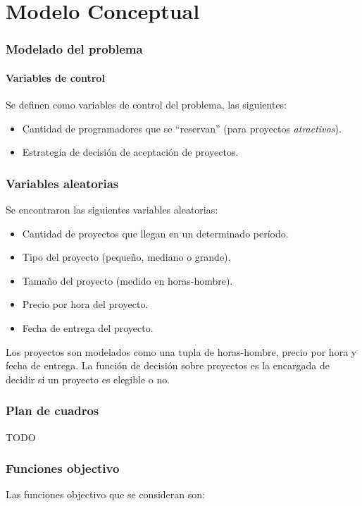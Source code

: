 \part*{Modelo Conceptual}

\section{Modelado del problema}

\subsection{Variables de control}
Se definen como variables de control del problema, las siguientes:

\begin{itemize}
    \item Cantidad de programadores que se ``reservan'' (para proyectos \textit{atractivos}).
    \item Estrategia de decisión de aceptación de proyectos.
\end{itemize}

\section{Variables aleatorias}
Se encontraron las siguientes variables aleatorias:

\begin{itemize}
    \item Cantidad de proyectos que llegan en un determinado período.
    \item Tipo del proyecto (pequeño, mediano o grande).
    \item Tamaño del proyecto (medido en horas-hombre).
    \item Precio por hora del proyecto.
    \item Fecha de entrega del proyecto.    
\end{itemize}

Los proyectos son modelados como una tupla de horas-hombre, precio por hora y fecha de entrega. La función de decisión sobre proyectos es la encargada de decidir 
si un proyecto es elegible o no.

\section{Plan de cuadros}
TODO

\section{Funciones objectivo}
Las funciones objectivo que se consideran son:

